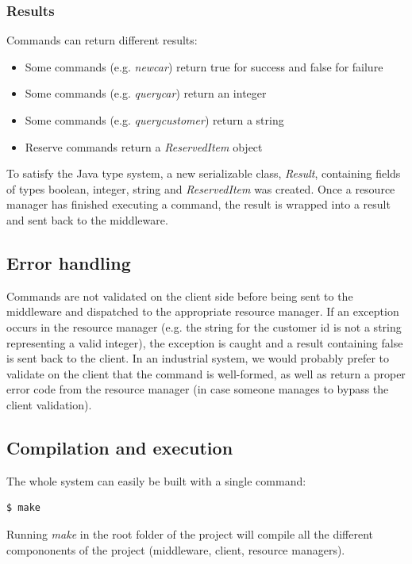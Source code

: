 \documentclass[11pt]{article}
\begin{document}
\subsubsection{Results}

Commands can return different results:

\begin{itemize}
\item Some commands (e.g. {\it newcar}) return true for success and
  false for failure
\item Some commands (e.g. {\it querycar}) return an integer
\item Some commands (e.g. {\it querycustomer}) return a string
\item Reserve commands return a {\it ReservedItem} object
\end{itemize}

To satisfy the Java type system, a new serializable class, {\it
  Result}, containing fields of types boolean, integer, string and
{\it ReservedItem} was created.  Once a resource manager has finished
executing a command, the result is wrapped into a result and sent back
to the middleware.

\subsection{Error handling}

Commands are not validated on the client side before being sent to the
middleware and dispatched to the appropriate resource manager.  If an
exception occurs in the resource manager (e.g. the string for the
customer id is not a string representing a valid integer), the
exception is caught and a result containing false is sent back to the
client.  In an industrial system, we would probably prefer to validate
on the client that the command is well-formed, as well as return a
proper error code from the resource manager (in case someone manages
to bypass the client validation).


\subsection{Compilation and execution}

The whole system can easily be built with a single command:


\begin{verbatim}
$ make
\end{verbatim}

Running {\it make} in the root folder of the project will compile
all the different compononents of the project (middleware, client,
resource managers).
\end{document}
